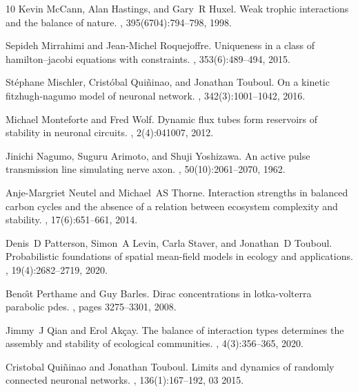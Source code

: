 \documentclass[onefignum,onetabnum]{siamart190516}
\newcommand{\1}{\mathbbm{1}}
\begin{document}
\begin{thebibliography}{10}
Kevin McCann, Alan Hastings, and Gary~R Huxel.
\newblock Weak trophic interactions and the balance of nature.
, 395(6704):794--798, 1998.

Sepideh Mirrahimi and Jean-Michel Roquejoffre.
\newblock Uniqueness in a class of hamilton--jacobi equations with constraints.
, 353(6):489--494, 2015.

St{\'e}phane Mischler, Crist{\'o}bal Qui{\~n}inao, and Jonathan Touboul.
\newblock On a kinetic fitzhugh-nagumo model of neuronal network.
, 342(3):1001--1042,
  2016.

Michael Monteforte and Fred Wolf.
\newblock Dynamic flux tubes form reservoirs of stability in neuronal circuits.
, 2(4):041007, 2012.

Jinichi Nagumo, Suguru Arimoto, and Shuji Yoshizawa.
\newblock An active pulse transmission line simulating nerve axon.
, 50(10):2061--2070, 1962.

Anje-Margriet Neutel and Michael~AS Thorne.
\newblock Interaction strengths in balanced carbon cycles and the absence of a
  relation between ecosystem complexity and stability.
, 17(6):651--661, 2014.

Denis~D Patterson, Simon~A Levin, Carla Staver, and Jonathan~D Touboul.
\newblock Probabilistic foundations of spatial mean-field models in ecology and
  applications.
, 19(4):2682--2719,
  2020.

Beno{\^\i}t Perthame and Guy Barles.
\newblock Dirac concentrations in lotka-volterra parabolic pdes.
, pages 3275--3301, 2008.

Jimmy~J Qian and Erol Ak{\c{c}}ay.
\newblock The balance of interaction types determines the assembly and
  stability of ecological communities.
, 4(3):356--365, 2020.

Cristobal Qui{\~n}inao and Jonathan Touboul.
\newblock Limits and dynamics of randomly connected neuronal networks.
, 136(1):167--192, 03 2015.


\end{thebibliography}
\end{document}
